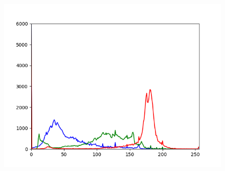 \begin{figure}[htb]
\begin{minipage}[c]{0.08\textwidth}
\end{minipage}
\hfill
\begin{minipage}[c]{0.3\textwidth}
\includegraphics[width=\textwidth]{Sources/Bild1_histo.png}
\end{minipage}
\end{figure}
